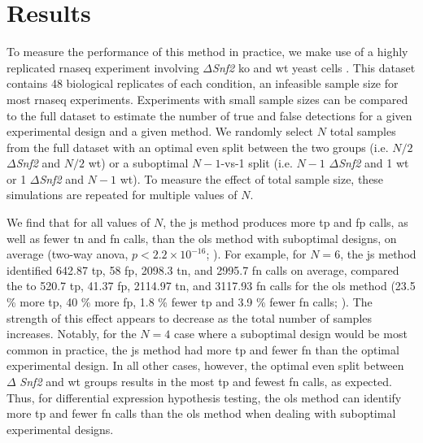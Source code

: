 \section{Results}

To measure the performance of this method in practice, we make use of a highly replicated \gls{rnaseq} experiment involving $\Delta$\emph{Snf2} \gls{ko} and \gls{wt} yeast cells \cite{gierlinskiStatisticalModelsRNAseq2015}.
This dataset contains 48 biological replicates of each condition, an infeasible sample size for most \gls{rnaseq} experiments.
Experiments with small sample sizes can be compared to the full dataset to estimate the number of true and false detections for a given experimental design and a given method.
We randomly select $N$ total samples from the full dataset with an optimal even split between the two groups (i.e. $N / 2$ $\Delta$\emph{Snf2} and $N / 2$ \gls{wt}) or a suboptimal $N - 1$-vs-1 split (i.e. $N - 1$ $\Delta$\emph{Snf2} and 1 \gls{wt} or 1 $\Delta$\emph{Snf2} and $N - 1$ \gls{wt}).
To measure the effect of total sample size, these simulations are repeated for multiple values of $N$.

We find that for all values of $N$, the \gls{js} method produces more \gls{tp} and \gls{fp} calls, as well as fewer \gls{tn} and \gls{fn} calls, than the \gls{ols} method with suboptimal designs, on average (two-way \gls{anova}, $p < 2.2 \times 10^{-16}$; ).
For example, for $N = 6$, the \gls{js} method identified 642.87 \gls{tp}, 58 \gls{fp}, 2098.3 \gls{tn}, and 2995.7 \gls{fn} calls on average, compared the to 520.7 \gls{tp}, 41.37 \gls{fp}, 2114.97 \gls{tn}, and 3117.93 \gls{fn} calls for the \gls{ols} method (23.5 \% more \gls{tp}, 40 \% more \gls{fp}, 1.8 \% fewer \gls{tp} and 3.9 \% fewer \gls{fn} calls; ).
The strength of this effect appears to decrease as the total number of samples increases.
Notably, for the $N = 4$ case where a suboptimal design would be most common in practice, the \gls{js} method had more \gls{tp} and fewer \gls{fn} than the optimal experimental design.
In all other cases, however, the optimal even split between $\Delta $ \emph{Snf2} and \gls{wt} groups results in the most \gls{tp} and fewest \gls{fn} calls, as expected.
Thus, for differential expression hypothesis testing, the \gls{ols} method can identify more \gls{tp} and fewer \gls{fn} calls than the \gls{ols} method when dealing with suboptimal experimental designs.


